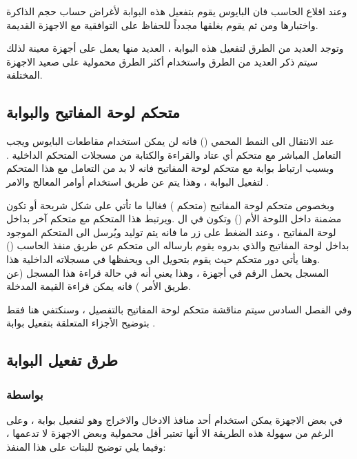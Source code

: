 \documentclass[document.tex]{subfiles}
\begin{document}
وعند اقلاع الحاسب فان البايوس يقوم بتفعيل هذه البوابة لأغراض حساب حجم الذاكرة واختبارها ومن ثم يقوم بغلقها مجدداً للحفاظ على التوافقية مع الاجهزة القديمة.

وتوجد العديد من الطرق لتفعيل هذه البوابة ، العديد منها يعمل على أجهزة معينة لذلك سيتم ذكر العديد من الطرق واستخدام أكثر الطرق محمولية على صعيد الاجهزة المختلفة.

\subsection{متحكم لوحة المفاتيح  والبوابة }
عند الانتقال الى النمط المحمي () فانه لن يمكن استخدام مقاطعات البايوس ويجب التعامل المباشر مع متحكم أي عتاد والقراءة والكتابة من مسجلات المتحكم الداخلية . وبسبب ارتباط بوابة  مع متحكم لوحة المفاتيح فانه لا بد من التعامل مع هذا المتحكم لتفعيل البوابة ، وهذا يتم عن طريق استخدام أوامر المعالج  والامر .

وبخصوص متحكم لوحة المفاتيح (متحكم ) فغالبا ما تأتي على شكل شريحة  أو تكون مضمنة داخل اللوحة الأم () وتكون في ال .ويرتبط هذا المتحكم مع متحكم آخر بداخل لوحة المفاتيح ، وعند الضغط على زر ما فانه يتم توليد  ويُرسل الى المتحكم الموجود بداخل لوحة المفاتيح والذي بدروه يقوم بارساله الى متحكم  عن طريق منفذ الحاسب () .وهنا يأتي دور متحكم  حيث يقوم بتحويل  الى  ويحفظها في مسجلاته الداخلية  هذا المسجل يحمل الرقم  في أجهزة ، وهذا يعني أنه في حالة قراءة هذا المسجل (عن طريق الأمر ) فانه يمكن قراءة القيمة المدخلة.

وفي الفصل السادس سيتم مناقشة متحكم لوحة المفاتيح بالتفصيل ، وسنكتفي هنا فقط بتوضيح الأجزاء المتعلقة بتفعيل بوابة .



\subsection{طرق تفعيل البوابة }

\subsubsection{بواسطة }

في بعض الاجهزة يمكن استخدام أحد منافذ الادخال والاخراج وهو  لتفعيل بوابة  ، وعلى الرغم من سهولة هذه الطريقة الا أنها تعتبر أقل محمولية وبعض الاجهزة لا تدعمها ، وفيما يلي توضيح للبتات على هذا المنفذ:
\end{document}
